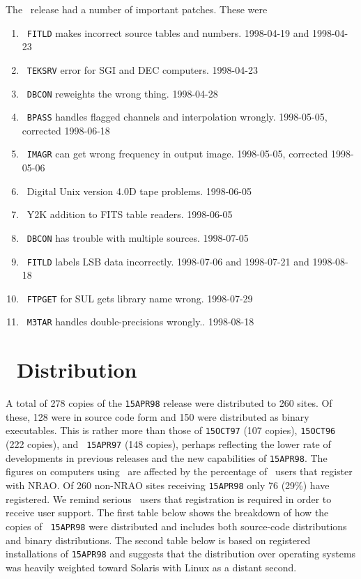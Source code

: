 The \OLDNAME\ release had a number of important patches.  These were
\begin{enumerate}
\item\ {\tt FITLD} makes incorrect source tables and numbers.
   1998-04-19 and 1998-04-23
\item\ {\tt TEKSRV} error for SGI and DEC computers. 1998-04-23
\item\ {\tt DBCON} reweights the wrong thing. 1998-04-28
\item\ {\tt BPASS} handles flagged channels and interpolation wrongly.
   1998-05-05, corrected 1998-06-18
\item\ {\tt IMAGR} can get wrong frequency in output image.
   1998-05-05, corrected 1998-05-06
\item\ Digital Unix version 4.0D tape problems. 1998-06-05
\item\ Y2K addition to FITS table readers. 1998-06-05
\item\ {\tt DBCON} has trouble with multiple sources. 1998-07-05
\item\ {\tt FITLD} labels LSB data incorrectly. 1998-07-06 and
   1998-07-21 and 1998-08-18
\item\ {\tt FTPGET} for SUL gets library name wrong. 1998-07-29
\item\ {\tt M3TAR} handles double-precisions wrongly.. 1998-08-18
\end{enumerate}

\section{\AIPS\ Distribution}

A total of 278 copies of the {\tt 15APR98} release were distributed to
260 sites.  Of these, 128 were in source code form and 150 were
distributed as binary executables.  This is rather more than those of
{\tt 15OCT97} (107 copies), {\tt 15OCT96} (222 copies), and {\tt
15APR97} (148 copies), perhaps reflecting the lower rate of
developments in previous releases and the new capabilities of
\hbox{{\tt 15APR98}}.  The figures on computers using \AIPS\ are
affected by the percentage of \AIPS\ users that register with
\hbox{NRAO}.  Of 260 non-NRAO sites receiving {\tt 15APR98} only 76
(29\%) have registered.  We remind serious \AIPS\ users that
registration is required in order to receive user support.
The first table below shows the breakdown of how the copies of {\tt
15APR98} were distributed and includes both source-code distributions
and binary distributions.  The second table below is based on
registered installations of {\tt 15APR98} and suggests that the
distribution over operating systems was heavily weighted toward
Solaris with Linux as a distant second.

